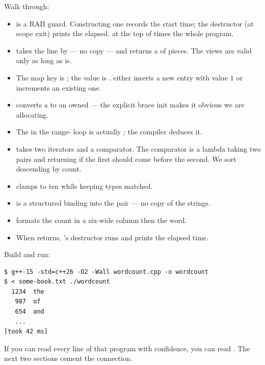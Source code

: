 Walk through:

\begin{itemize}[leftmargin=*]
  \item {} is a RAII guard. Constructing one records the
    start time; the destructor (at scope exit) prints the elapsed.
     at the top of  times the whole
    program.
  \item {} takes the line by  ---
    no copy --- and returns a 
    of pieces. The views are valid only as long as  is.
  \item The map key is ; the value is .
     either inserts a new entry with value
    $1$ or increments an existing one.
  \item {} converts a 
    to an owned  --- the explicit brace init
    makes it obvious we are allocating.
  \item The  in the range- loop is
    actually ; the compiler
    deduces it.
  \item {} takes two iterators and a comparator. The
    comparator is a lambda taking two pairs and returning
     if the first should come before the second. We
    sort descending by count.
  \item {} clamps to
    ten while keeping types matched.
  \item {} is a
    structured binding into the pair --- no copy of the strings.
  \item {} formats
    the count in a six-wide column then the word.
  \item When  returns, 's destructor runs and
    prints the elapsed time.
\end{itemize}

Build and run:

\begin{lstlisting}[style=shell]
$ g++-15 -std=c++26 -O2 -Wall wordcount.cpp -o wordcount
$ < some-book.txt ./wordcount
  1234  the
   987  of
   654  and
   ...
[took 42 ms]
\end{lstlisting}

If you can read every line of that program with confidence, you can
read \maya{}. The next two sections cement the connection.


